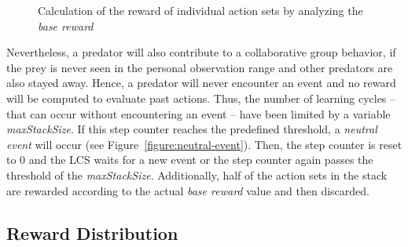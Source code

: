 \begin{figure*}[ht]
  \hfill
  \hfill
	\caption{Calculation of the reward of individual action sets by analyzing the \emph{base reward}}
	\label{figure:experiment}
\end{figure*}


Nevertheless, a predator will also contribute to a collaborative group behavior, if the prey is never seen in the personal observation range and other predators are also stayed away. Hence, a predator will never encounter an event and no reward will be computed to evaluate past actions. Thus, the number of learning cycles -- that can occur without encountering an event -- have been limited by a variable \emph{maxStackSize}. If this step counter reaches the predefined threshold, a \emph{neutral event} will occur (see Figure~\ref{figure:neutral-event}). Then, the step counter is reset to $0$ and the LCS waits for a new event or the step counter again passes the threshold of the \emph{maxStackSize}. Additionally, half of the action sets in the stack are rewarded according to the actual \emph{base reward} value and then discarded.


\subsection{Reward Distribution}
\label{subsection:reward-distribution}

